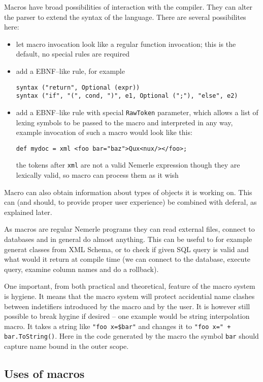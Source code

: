 \documentclass{article}
\begin{document}
Macros have broad possibilities of interaction with the compiler.
They can alter the parser to extend the syntax of the language.
There are several possibilites here:
\begin{itemize}
\item let macro invocation look like a regular function invocation;
      this is the default, no special rules are required
\item add a EBNF--like rule, for example
\begin{verbatim}
syntax ("return", Optional (expr))
syntax ("if", "(", cond, ")", e1, Optional (";"), "else", e2)
\end{verbatim}
\item add a EBNF--like rule with special {\tt RawToken} parameter,
      which allows a list of lexing symbols to be passed
      to the macro and interpreted in any way, example invocation
      of such a macro would look like this:
\begin{verbatim}
def mydoc = xml <foo bar="baz">Qux<nux/></foo>;
\end{verbatim}
   the tokens after \texttt{xml} are not a valid Nemerle expression
   though they are lexically valid, so macro can process them as it wish
\end{itemize}

Macro can also obtain information about types of objects it is
working on. This can (and should, to provide proper user experience) be 
combined with deferal, as explained later.

As macros are regular Nemerle programs they can read external
files, connect to databases  and in general do almost anything.
This can be useful to for example generat classes from XML Schema,
or to check if given SQL query is valid and what would it return
at compile time (we can connect to the database, execute query, examine
column names and do a rollback).

One important, from both practical and theoretical, feature of the macro 
system is hygiene. It means that the macro system will protect accidential
name clashes between indetifiers introduced by the macro and by the user.
It is however still possible to break hygine if desired -- one example
would be string interpolation macro. It takes a string like 
\texttt{"foo x=\$bar"} and changes it to \texttt{"foo x=" + bar.ToString()}.
Here in the code generated by the macro the symbol \texttt{bar} should
capture name bound in the outer scope.

\subsection{Uses of macros}
\end{document}
